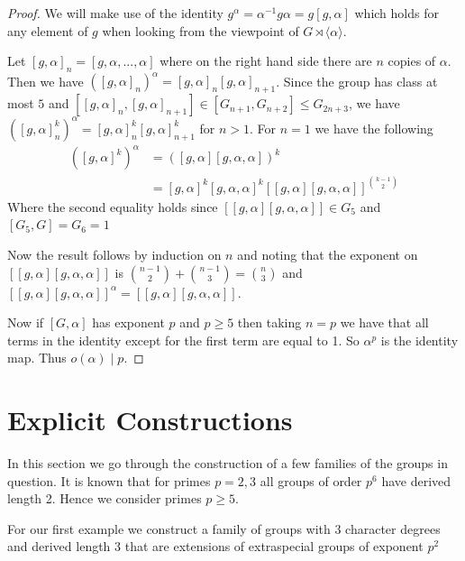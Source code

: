 \documentclass[]{amsart}
\theoremstyle{definition}
\theoremstyle{definition}
\theoremstyle{definition}
\theoremstyle{definition}
\theoremstyle{remark}
\theoremstyle{remark}
\newcommand{\paren}[1]{\left({#1}\right)}
\begin{document}
        \begin{proof}
            




            We will make use of the identity $g^{\alpha}=\alpha^{-1}g\alpha=g[g,\alpha]$ which holds for any element of $g$ when looking from the viewpoint of $G\rtimes \langle \alpha \rangle$.

            Let $[g,\alpha]_n=[g,\alpha,...,\alpha]$ where on the right hand side there are $n$ copies of $\alpha$. Then we have $([g,\alpha]_n)^{\alpha}=[g,\alpha]_n[g,\alpha]_{n+1}$. Since the group has class at most $5$ and $[[g,\alpha]_n,[g,\alpha]_{n+1}]\in [G_{n+1},G_{n+2}]\leq G_{2n+3}$, we have $([g,\alpha]_n^k)^{\alpha}=[g,\alpha]_n^k[g,\alpha]_{n+1}^k$ for $n>1$. For $n=1$ we have the following
            \begin{align*}
                ([g,\alpha]^k)^\alpha&=\paren{[g,\alpha][g,\alpha,\alpha]}^k\\
                &=[g,\alpha]^k[g,\alpha,\alpha]^k[[g,\alpha][g,\alpha,\alpha]]^{\binom{k-1}{2}}
            \end{align*}
            Where the second equality holds since $[[g,\alpha][g,\alpha,\alpha]]\in G_5$ and $[G_5,G]=G_6=1$

            Now the result follows by induction on $n$ and noting that the exponent on $[[g,\alpha][g,\alpha,\alpha]]$ is $\binom{n-1}{2}+\binom{n-1}{3}=\binom{n}{3}$ and $[[g,\alpha][g,\alpha,\alpha]]^{\alpha}=[[g,\alpha][g,\alpha,\alpha]]$.
            

            Now if $[G,\alpha]$ has exponent $p$ and $p\geq 5$ then taking $n=p$ we have that all terms in the identity  except for the first term are equal to 1. So $\alpha^p$ is the identity map. Thus $o(\alpha)\mid p$. 
        \end{proof}

    \section{Explicit Constructions}
        In this section we go through the construction of a few families of the groups in question. It is known that for primes $p=2,3$ all groups of order $p^6$ have derived length 2. Hence we consider primes $p\geq 5$.

        For our first example we construct a family of groups with 3 character degrees and derived length 3 that are extensions of extraspecial groups of exponent $p^2$
\end{document}
